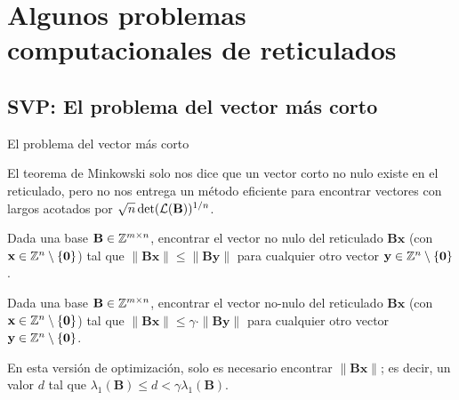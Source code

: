 \section{Algunos problemas computacionales de reticulados}

\subsection{SVP: El problema del vector más corto}

\begin{frame}{El problema del vector más corto}

El teorema de Minkowski solo nos dice que un vector corto no nulo existe en el reticulado, pero no nos entrega un método eficiente para encontrar vectores con largos acotados por $\sqrt{n}\det(\mathbf{\mathcal{L}(\mathbf{B})})^{1/n}$.

\begin{definition}
Dada una base $\mathbf{B}\in \mathbb{Z}^{m\times n}$, encontrar el vector no nulo del reticulado $\mathbf{Bx}$ (con $\mathbf{x}\in\mathbb{Z}^n\setminus\{\mathbf{0}\}$) tal que $\|\mathbf{Bx}\| \leq \|\mathbf{By}\|$ para cualquier otro vector $\mathbf{y}\in\mathbb{Z}^n\setminus\{\mathbf{0}\}$. 
\end{definition}

\begin{definition}
Dada una base $\mathbf{B}\in \mathbb{Z}^{m\times n}$, encontrar el vector no-nulo del reticulado $\mathbf{Bx}$ (con $\mathbf{x}\in\mathbb{Z}^n\setminus\{\mathbf{0}\}$) tal que $\|\mathbf{Bx}\| \leq \gamma \cdot \|\mathbf{By}\|$ para cualquier otro vector $\mathbf{y}\in\mathbb{Z}^n\setminus\{\mathbf{0}\}$. \\
\end{definition}

En esta versión de optimización, solo es necesario encontrar $\|\mathbf{Bx}\|$; es decir, un valor $d$ tal que $\lambda_1(\mathbf{B}) \leq d < \gamma\lambda_1(\mathbf{B})$.
\end{frame}

